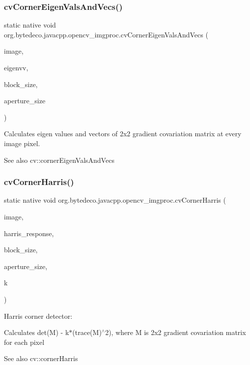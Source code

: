 \subsubsection{\texorpdfstring{cv\+Corner\+Eigen\+Vals\+And\+Vecs()}{cvCornerEigenValsAndVecs()}}
{\footnotesize\ttfamily static native void org.\+bytedeco.\+javacpp.\+opencv\+\_\+imgproc.\+cv\+Corner\+Eigen\+Vals\+And\+Vecs (\begin{DoxyParamCaption}\item[{@Const Cv\+Arr}]{image,  }\item[{Cv\+Arr}]{eigenvv,  }\item[{int}]{block\+\_\+size,  }\item[{int}]{aperture\+\_\+size }\end{DoxyParamCaption})\hspace{0.3cm}{\ttfamily [static]}}



Calculates eigen values and vectors of 2x2 gradient covariation matrix at every image pixel. 

\begin{DoxySeeAlso}{See also}
cv\+::corner\+Eigen\+Vals\+And\+Vecs 
\end{DoxySeeAlso}
\mbox{\label{group__imgproc__c_ga9243e6554465c5fb66ff92e545d5d634}} 
\subsubsection{\texorpdfstring{cv\+Corner\+Harris()}{cvCornerHarris()}}
{\footnotesize\ttfamily static native void org.\+bytedeco.\+javacpp.\+opencv\+\_\+imgproc.\+cv\+Corner\+Harris (\begin{DoxyParamCaption}\item[{@Const Cv\+Arr}]{image,  }\item[{Cv\+Arr}]{harris\+\_\+response,  }\item[{int}]{block\+\_\+size,  }\item[{int}]{aperture\+\_\+size,  }\item[{double}]{k }\end{DoxyParamCaption})\hspace{0.3cm}{\ttfamily [static]}}



Harris corner detector\+: 

Calculates det(\+M) -\/ k$\ast$(trace(\+M)$^\wedge$2), where M is 2x2 gradient covariation matrix for each pixel \begin{DoxySeeAlso}{See also}
cv\+::corner\+Harris 
\end{DoxySeeAlso}
\mbox{\label{group__imgproc__c_ga2efab8d0a4755c7003c87d3fd64477bb}} 
